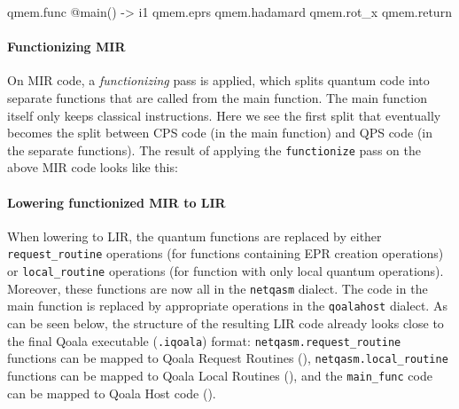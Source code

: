 \begin{pycode}
qmem.func @main() -> i1 {
    qmem.eprs %
    qmem.hadamard %
    qmem.rot_x %
    qmem.return %
}
\end{pycode}

\paragraph{Functionizing MIR}
On MIR code, a \emph{functionizing} pass is applied, which splits quantum code into separate functions that are called from the main function.
The main function itself only keeps classical instructions.
Here we see the first split that eventually becomes the split between CPS code (in the main function) and QPS code (in the separate functions).
The result of applying the \texttt{functionize} pass on the above MIR code looks like this:


\paragraph{Lowering functionized MIR to LIR}
When lowering to LIR, the quantum functions are replaced by either \texttt{request\_routine} operations (for functions containing EPR creation operations) or \texttt{local\_routine} operations (for function with only local quantum operations).
Moreover, these functions are now all in the \texttt{netqasm} dialect.
The code in the main function is replaced by appropriate operations in the \texttt{qoalahost} dialect.
As can be seen below, the structure of the resulting LIR code already looks close to the final Qoala executable (\texttt{.iqoala}) format: \texttt{netqasm.request\_routine} functions can be mapped to Qoala Request Routines (), \texttt{netqasm.local\_routine} functions can be mapped to Qoala Local Routines (), and the \texttt{main\_func} code can be mapped to Qoala Host code ().

